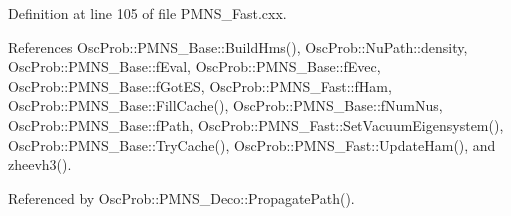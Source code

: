 Definition at line 105 of file P\+M\+N\+S\+\_\+\+Fast.\+cxx.



References Osc\+Prob\+::\+P\+M\+N\+S\+\_\+\+Base\+::\+Build\+Hms(), Osc\+Prob\+::\+Nu\+Path\+::density, Osc\+Prob\+::\+P\+M\+N\+S\+\_\+\+Base\+::f\+Eval, Osc\+Prob\+::\+P\+M\+N\+S\+\_\+\+Base\+::f\+Evec, Osc\+Prob\+::\+P\+M\+N\+S\+\_\+\+Base\+::f\+Got\+ES, Osc\+Prob\+::\+P\+M\+N\+S\+\_\+\+Fast\+::f\+Ham, Osc\+Prob\+::\+P\+M\+N\+S\+\_\+\+Base\+::\+Fill\+Cache(), Osc\+Prob\+::\+P\+M\+N\+S\+\_\+\+Base\+::f\+Num\+Nus, Osc\+Prob\+::\+P\+M\+N\+S\+\_\+\+Base\+::f\+Path, Osc\+Prob\+::\+P\+M\+N\+S\+\_\+\+Fast\+::\+Set\+Vacuum\+Eigensystem(), Osc\+Prob\+::\+P\+M\+N\+S\+\_\+\+Base\+::\+Try\+Cache(), Osc\+Prob\+::\+P\+M\+N\+S\+\_\+\+Fast\+::\+Update\+Ham(), and zheevh3().



Referenced by Osc\+Prob\+::\+P\+M\+N\+S\+\_\+\+Deco\+::\+Propagate\+Path().


